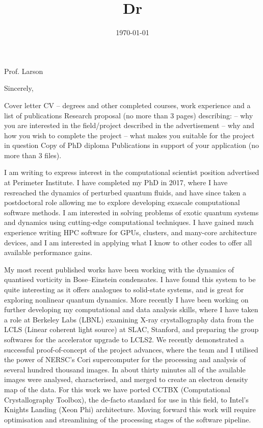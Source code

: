 \documentclass[11pt,a4paper,unicode]{moderncv}
\title{Dr}
\begin{document}
    \date{\today} %
    \opening{Prof. Larson}
    \closing{Sincerely,}
    \makelettertitle
{
    \vspace{-0.5cm}


    Cover letter
    CV – degrees and other completed courses, work experience and a list of publications
    Research proposal (no more than 3 pages) describing:
    – why you are interested in the field/project described in the advertisement
    – why and how you wish to complete the project
    – what makes you suitable for the project in question
    Copy of PhD diploma
    Publications in support of your application (no more than 3 files).


    I am writing to express interest in the computational scientist position advertised at Perimeter Institute. I have completed my PhD in 2017, where I have resreached the dynamics of perturbed quantum fluids, and have since taken a postdoctoral role allowing me to explore developing exascale computational software methods. I am interested in solving problems of exotic quantum systems and dynamics using cutting-edge computational techniques. I have gained much experience writing HPC software for GPUs, clusters, and many-core architecture devices, and I am interested in applying what I know to other codes to offer all available performance gains.

    My most recent published works have been working with the dynamics of quantised vorticity in Bose--Einstein condensates. I have found this system to be quite interesting as it offers analogues to solid-state systems, and is great for exploring nonlinear quantum dynamics. More recently I have been working on further developing my computational and data analysis skills, where I have taken a role at Berkeley Labs (LBNL) examining X-ray crystallography data from the LCLS (Linear coherent light source) at SLAC, Stanford, and preparing the group softwares for the accelerator upgrade to LCLS2. We recently demonstrated a successful proof-of-concept of the project advances, where the team and I utilised the power of NERSC's Cori supercomputer for the processing and analysis of several hundred thousand images. In about thirty minutes all of the available images were analysed, characterised, and merged to create an electron density map of the data. For this work we have ported CCTBX (Computational Crystallography Toolbox), the de-facto standard for use in this field, to Intel's Knights Landing (Xeon Phi) architecture. Moving forward this work will require optimisation and streamlining of the processing stages of the software pipeline.

}
\end{document}
